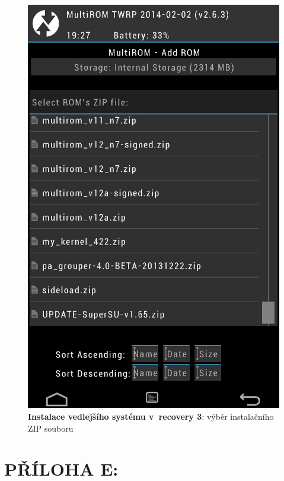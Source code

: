 \documentclass[12pt, a4paper, oneside]{article}
\newcommand{\B}{\textbf} %
\begin{document}
\begin{figure}[H]
\begin{center}
 \includegraphics[height=\textheight+30]{img/recovery_install3.png}
\caption{\B{Instalace vedlejšího systému v~recovery 3}: výběr instalačního ZIP souboru}
\end{center}
\end{figure}

\addtolength{\voffset}{70pt}

 \section*{PŘÍLOHA E:}
\end{document}
